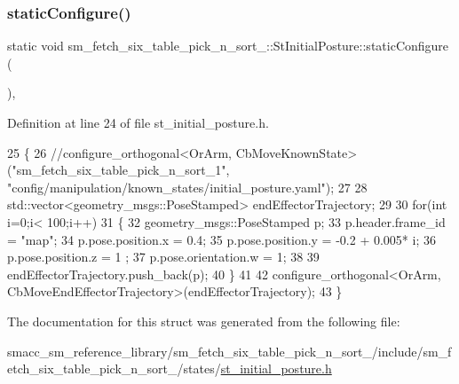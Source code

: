 \subsubsection{\texorpdfstring{static\+Configure()}{staticConfigure()}}
{\footnotesize\ttfamily static void sm\+\_\+fetch\+\_\+six\+\_\+table\+\_\+pick\+\_\+n\+\_\+sort\+\_\+::\+St\+Initial\+Posture\+::static\+Configure (\begin{DoxyParamCaption}{ }\end{DoxyParamCaption})\hspace{0.3cm}{\ttfamily [inline]}, {\ttfamily [static]}}



Definition at line 24 of file st\+\_\+initial\+\_\+posture.\+h.


\begin{DoxyCode}
25         \{
26             \textcolor{comment}{//configure\_orthogonal<OrArm, CbMoveKnownState>("sm\_fetch\_six\_table\_pick\_n\_sort\_1",
       "config/manipulation/known\_states/initial\_posture.yaml");}
27 
28             std::vector<geometry\_msgs::PoseStamped> endEffectorTrajectory;
29 
30             \textcolor{keywordflow}{for}(\textcolor{keywordtype}{int} i=0;i< 100;i++)
31             \{
32                 geometry\_msgs::PoseStamped p;
33                 p.header.frame\_id = \textcolor{stringliteral}{"map"};
34                 p.pose.position.x = 0.4;
35                 p.pose.position.y = -0.2 + 0.005* i;
36                 p.pose.position.z = 1 ;
37                 p.pose.orientation.w = 1;
38 
39                 endEffectorTrajectory.push\_back(p);
40             \}
41 
42             configure\_orthogonal<OrArm, CbMoveEndEffectorTrajectory>(endEffectorTrajectory);
43         \}
\end{DoxyCode}


The documentation for this struct was generated from the following file\+:\begin{DoxyCompactItemize}
\item 
smacc\+\_\+sm\+\_\+reference\+\_\+library/sm\+\_\+fetch\+\_\+six\+\_\+table\+\_\+pick\+\_\+n\+\_\+sort\+\_/include/sm\+\_\+fetch\+\_\+six\+\_\+table\+\_\+pick\+\_\+n\+\_\+sort\+\_/states/\hyperlink{sm__fetch__six__table__pick__n__sort__1_2include_2sm__fetch__six__table__pick__n__sort__1_2states_2st__initial__posture_8h}{st\+\_\+initial\+\_\+posture.\+h}\end{DoxyCompactItemize}
